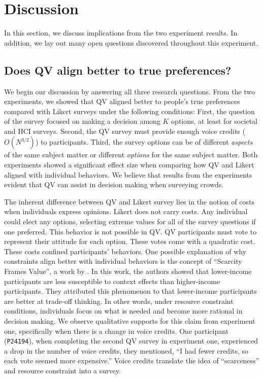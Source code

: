\section{Discussion} \label{discussion}
In this section, we discuss implications from the two experiment results. In addition, we lay out many open questions discovered throughout this experiment.

\subsection{Does QV align better to true preferences?}
We begin our discussion by answering all three research questions. From the two experiments, we showed that QV aligned better to people's true preferences compared with Likert surveys under the following conditions: First, the question of the survey focused on making a decision among $K$ options, at least for societal and HCI surveys. Second, the QV survey must provide enough voice credits ($O(N^{3/2})$) to participants. Third, the survey options can be of different \textit{aspects} of the same subject matter or different \textit{options} for the same subject matter. Both experiments showed a significant effect size when comparing how QV and Likert aligned with individual behaviors. We believe that results from the experiments evident that QV can assist in decision making when surveying crowds.

The inherent difference between QV and Likert survey lies in the notion of costs when individuals express opinions. Likert does not carry costs. Any individual could elect any options, selecting extreme values for all of the survey questions if one preferred. This behavior is not possible in QV. QV participants must vote to represent their attitude for each option. These votes come with a quadratic cost. These costs confined participants' behaviors. One possible explanation of why constraints align better with individual behaviors is the concept of ``Scarcity Frames Value'', a work by \textcite{Shah2015a}. In this work, the authors showed that lower-income participants are less susceptible to context effects than higher-income participants. They attributed this phenomenon to that lower-income participants are better at trade-off thinking. In other words, under resource constraint conditions, individuals focus on what is needed and become more rational in decision making. We observe qualitative supports for this claim from experiment one, specifically when there is a change in voice credits. One participant (\texttt{P24194}), when completing the second QV survey in experiment one, experienced a drop in the number of voice credits, they mentioned, ``I had fewer credits, so each vote seemed more expensive.'' Voice credits translate the idea of ``scarceness'' and resource constraint into a survey.

